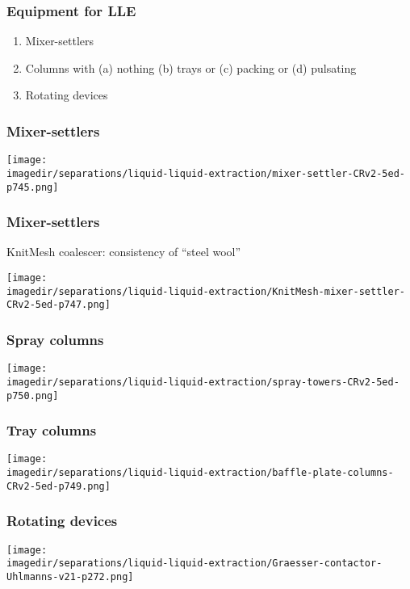 \begin{frame}\frametitle{Equipment for LLE}
	
	\begin{enumerate}
		\item	Mixer-settlers
		\item	Columns with (a) nothing (b) trays or (c) packing or (d) pulsating
		\item	Rotating devices
	\end{enumerate}
\end{frame}

\begin{frame}\frametitle{Mixer-settlers}
	\begin{center}
		\texttt{[image: \\imagedir/separations/liquid-liquid-extraction/mixer-settler-CRv2-5ed-p745.png]}
	\end{center}
\end{frame}

\begin{frame}\frametitle{Mixer-settlers}
	KnitMesh coalescer: consistency of ``steel wool''
	\begin{center}
		\texttt{[image: \\imagedir/separations/liquid-liquid-extraction/KnitMesh-mixer-settler-CRv2-5ed-p747.png]}
	\end{center}
\end{frame}

\begin{frame}\frametitle{Spray columns}
	\begin{center}
		\texttt{[image: \\imagedir/separations/liquid-liquid-extraction/spray-towers-CRv2-5ed-p750.png]}
	\end{center}
	\vspace{-14pt}
\end{frame}

\begin{frame}\frametitle{Tray columns}
	\begin{center}
		\texttt{[image: \\imagedir/separations/liquid-liquid-extraction/baffle-plate-columns-CRv2-5ed-p749.png]}
	\end{center}
	\vspace{-14pt}
\end{frame}

\begin{frame}\frametitle{Rotating devices}
	\begin{center}
		\texttt{[image: \\imagedir/separations/liquid-liquid-extraction/Graesser-contactor-Uhlmanns-v21-p272.png]}
	\end{center}
	\vspace{-12pt}
\end{frame}

